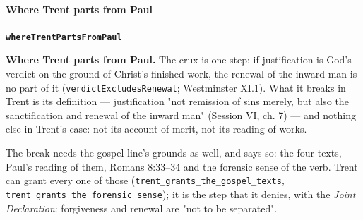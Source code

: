 \documentclass[11pt]{article}
\begin{document}
\paragraph*{Where Trent parts from Paul}
\leavevmode\par
\par\medskip\noindent\textbf{\texttt{where\allowbreak{}Trent\allowbreak{}Parts\allowbreak{}From\allowbreak{}Paul}}\par\nobreak\noindent
\textbf{Where Trent parts from Paul.} The crux is one step: if justification is God's verdict on the ground of Christ's finished work, the renewal of the inward man is no part of it (\texttt{verdict\allowbreak{}Excludes\allowbreak{}Renewal}; Westminster XI.1). What it breaks in Trent is its definition — justification "not remission of sins merely, but also the sanctification and renewal of the inward man" (Session VI, ch. 7) — and nothing else in Trent's case: not its account of merit, not its reading of works.

The break needs the gospel line's grounds as well, and says so: the four texts, Paul's reading of them, Romans 8:33–34 and the forensic sense of the verb. Trent can grant every one of those (\texttt{trent\_\allowbreak{}grants\_\allowbreak{}the\_\allowbreak{}gospel\_\allowbreak{}texts}, \texttt{trent\_\allowbreak{}grants\_\allowbreak{}the\_\allowbreak{}forensic\_\allowbreak{}sense}); it is the step that it denies, with the \emph{Joint Declaration}: forgiveness and renewal are "not to be separated".
\end{document}
